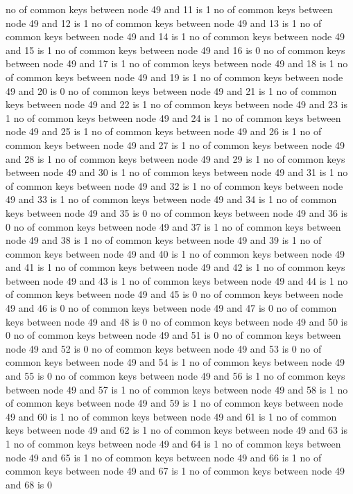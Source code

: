 no of common keys between node 49 and 11 is 1
no of common keys between node 49 and 12 is 1
no of common keys between node 49 and 13 is 1
no of common keys between node 49 and 14 is 1
no of common keys between node 49 and 15 is 1
no of common keys between node 49 and 16 is 0
no of common keys between node 49 and 17 is 1
no of common keys between node 49 and 18 is 1
no of common keys between node 49 and 19 is 1
no of common keys between node 49 and 20 is 0
no of common keys between node 49 and 21 is 1
no of common keys between node 49 and 22 is 1
no of common keys between node 49 and 23 is 1
no of common keys between node 49 and 24 is 1
no of common keys between node 49 and 25 is 1
no of common keys between node 49 and 26 is 1
no of common keys between node 49 and 27 is 1
no of common keys between node 49 and 28 is 1
no of common keys between node 49 and 29 is 1
no of common keys between node 49 and 30 is 1
no of common keys between node 49 and 31 is 1
no of common keys between node 49 and 32 is 1
no of common keys between node 49 and 33 is 1
no of common keys between node 49 and 34 is 1
no of common keys between node 49 and 35 is 0
no of common keys between node 49 and 36 is 0
no of common keys between node 49 and 37 is 1
no of common keys between node 49 and 38 is 1
no of common keys between node 49 and 39 is 1
no of common keys between node 49 and 40 is 1
no of common keys between node 49 and 41 is 1
no of common keys between node 49 and 42 is 1
no of common keys between node 49 and 43 is 1
no of common keys between node 49 and 44 is 1
no of common keys between node 49 and 45 is 0
no of common keys between node 49 and 46 is 0
no of common keys between node 49 and 47 is 0
no of common keys between node 49 and 48 is 0
no of common keys between node 49 and 50 is 0
no of common keys between node 49 and 51 is 0
no of common keys between node 49 and 52 is 0
no of common keys between node 49 and 53 is 0
no of common keys between node 49 and 54 is 1
no of common keys between node 49 and 55 is 0
no of common keys between node 49 and 56 is 1
no of common keys between node 49 and 57 is 1
no of common keys between node 49 and 58 is 1
no of common keys between node 49 and 59 is 1
no of common keys between node 49 and 60 is 1
no of common keys between node 49 and 61 is 1
no of common keys between node 49 and 62 is 1
no of common keys between node 49 and 63 is 1
no of common keys between node 49 and 64 is 1
no of common keys between node 49 and 65 is 1
no of common keys between node 49 and 66 is 1
no of common keys between node 49 and 67 is 1
no of common keys between node 49 and 68 is 0
